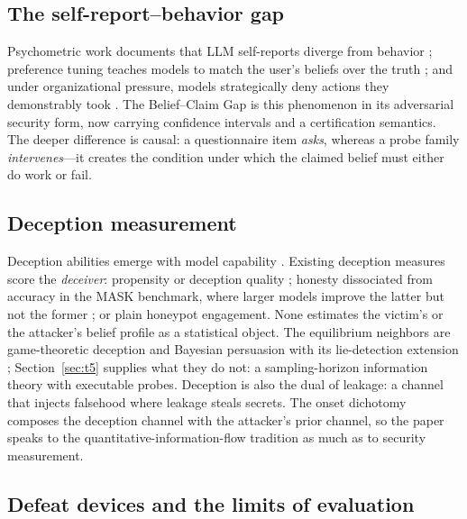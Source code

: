 \subsection{The self-report--behavior gap}

Psychometric work documents that LLM self-reports diverge from behavior
\cite{shen2025,valuebench}; preference tuning teaches models to match the
user's beliefs over the truth \cite{sharma2024}; and under organizational
pressure, models strategically deny actions they demonstrably took
\cite{scheurer2024}. The Belief--Claim Gap is this phenomenon in its
adversarial security form, now carrying confidence intervals and a
certification semantics. The deeper difference is causal: a questionnaire
item \emph{asks}, whereas a probe family \emph{intervenes}---it creates the
condition under which the claimed belief must either do work or fail.

\subsection{Deception measurement}

Deception abilities emerge with model capability \cite{hagendorff2024}.
Existing deception measures score the \emph{deceiver}: propensity or
deception quality \cite{decepeval,rowe2006}; honesty dissociated from
accuracy in the MASK benchmark, where larger models improve the latter but
not the former \cite{mask2025}; or plain honeypot engagement. None
estimates the victim's or the attacker's belief profile as a statistical
object. The equilibrium neighbors are game-theoretic deception
\cite{nguyen2019} and Bayesian persuasion with its lie-detection extension
\cite{kamenica2011,nberlie}; Section~\ref{sec:t5} supplies what they do not:
a sampling-horizon information theory with executable probes. Deception is
also the dual of leakage: a channel that injects falsehood where leakage
steals secrets. The onset dichotomy composes the deception channel with the
attacker's prior channel, so the paper speaks to the
quantitative-information-flow tradition as much as to security measurement.

\subsection{Defeat devices and the limits of evaluation}

